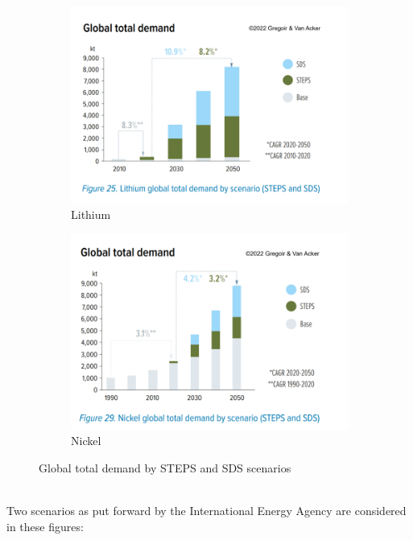 \documentclass[../summary.tex]{subfiles}
\begin{document}
\begin{figure}[H]
	\centering
	\begin{subfigure}{.5\textwidth}
		\centering
		\includegraphics[width=1\linewidth]{../images/Global_lithium_demand_STEPS_SDS}
		\caption{Lithium}
		\label{fig:Lithium}
	\end{subfigure}%
	\begin{subfigure}{.5\textwidth}
		\centering
		\includegraphics[width=1\linewidth]{../images/Global_nickel_demand_STEPS_SDS}
		\caption{Nickel}
		\label{fig:Nickel}
	\end{subfigure}
	\caption{Global total demand by STEPS  and SDS scenarios}
	\label{fig:Global total demand}
\end{figure}
\ \\
Two scenarios as put forward by the International Energy Agency are considered in these figures:\\
\end{document}
